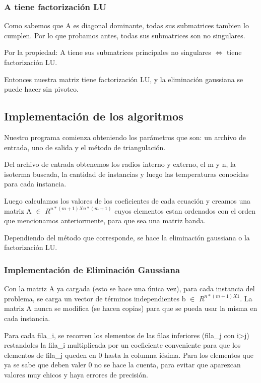 
\subsubsection{A tiene factorización LU}


Como sabemos que A es diagonal dominante, todas sus submatrices tambien lo cumplen. Por lo que probamos antes, todas sus submatrices son no singulares. 

Por la propiedad: A tiene sus submatrices principales no singulares $\Leftrightarrow$ tiene factorización LU.

Entonces nuestra matriz tiene factorización LU, y la eliminación gaussiana se puede hacer sin pivoteo.




\subsection{Implementación de los algoritmos}

Nuestro programa comienza obteniendo los parámetros que son: un archivo de entrada, uno de salida y el método de triangulación. 

Del archivo de entrada obtenemos los radios interno y externo, el m y n, la isoterma buscada, la cantidad de instancias y luego las temperaturas conocidas para cada instancia.  

Luego calculamos los valores de los coeficientes de cada ecuación y creamos una matriz A $\in$ $R^{n*(m+1) X n*(m+1)}$ cuyos elementos estan ordenados con el orden que mencionamos anteriormente, para que sea una matriz banda.

Dependiendo del método que corresponde, se hace la eliminación gaussiana o la factorización LU.

\subsubsection{Implementación de Eliminación Gaussiana}

Con la matriz A ya cargada (esto se hace una única vez), para cada instancia del problema, se carga un vector de términos independientes b $\in$ $R^{n*(m+1) X 1}$. La matriz A nunca se modifica (se hacen copias) para que se pueda usar la misma en cada instancia. 

Para cada fila_{i}, se recorren los elementos de las filas inferiores (fila_{j} con i>j) restandoles la fila_{i} multiplicada por un coeficiente conveniente para que los elementos de fila_{j} queden en 0 hasta la columna iésima. Para los elementos que ya se sabe que deben valer 0 no se hace la cuenta, para evitar que aparezcan valores muy chicos y haya errores de precisión.

